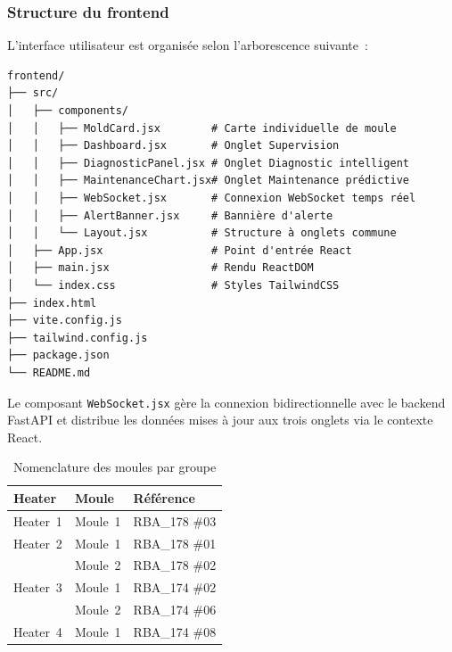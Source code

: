 \subsubsection{Structure du frontend}

L'interface utilisateur est organisée selon l'arborescence suivante~:

\begin{center}
\begin{minipage}{0.70\textwidth}
\begin{verbatim}
frontend/
├── src/
│   ├── components/
│   │   ├── MoldCard.jsx        # Carte individuelle de moule
│   │   ├── Dashboard.jsx       # Onglet Supervision
│   │   ├── DiagnosticPanel.jsx # Onglet Diagnostic intelligent
│   │   ├── MaintenanceChart.jsx# Onglet Maintenance prédictive
│   │   ├── WebSocket.jsx       # Connexion WebSocket temps réel
│   │   ├── AlertBanner.jsx     # Bannière d'alerte
│   │   └── Layout.jsx          # Structure à onglets commune
│   ├── App.jsx                 # Point d'entrée React
│   ├── main.jsx                # Rendu ReactDOM
│   └── index.css               # Styles TailwindCSS
├── index.html
├── vite.config.js
├── tailwind.config.js
├── package.json
└── README.md
\end{verbatim}
\end{minipage}
\end{center}

Le composant \texttt{WebSocket.jsx} gère la connexion bidirectionnelle avec le backend FastAPI et distribue les données mises à jour aux trois onglets via le contexte React.

\begin{table}[htbp]
\centering
\caption{Nomenclature des moules par groupe}
\label{tab:nomenclature}
\begin{tabular}{p{}p{}p{}}
\toprule
\textbf{Heater} & \textbf{Moule} & \textbf{Référence} \\
\midrule
Heater~1 & Moule~1 & RBA\_178 \#03 \\
Heater~2 & Moule~1 & RBA\_178 \#01 \\
         & Moule~2 & RBA\_178 \#02 \\
Heater~3 & Moule~1 & RBA\_174 \#02 \\
         & Moule~2 & RBA\_174 \#06 \\
Heater~4 & Moule~1 & RBA\_174 \#08 \\
\bottomrule
\end{tabular}
\end{table}

